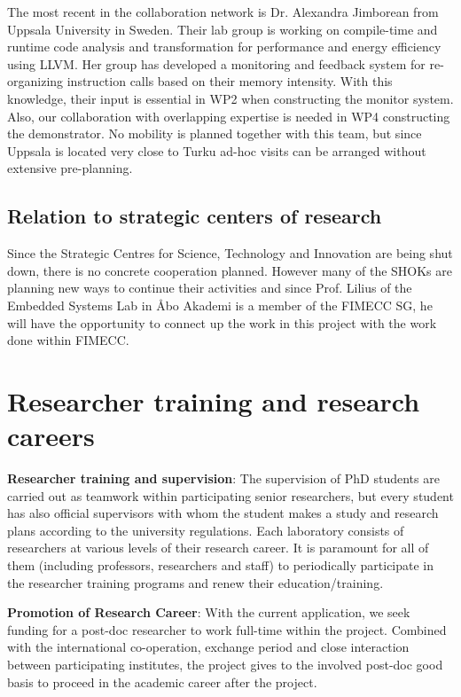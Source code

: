 \documentclass{article}
\begin{document}
The most recent in the collaboration network is Dr. Alexandra Jimborean from Uppsala University in Sweden.
Their lab group is working on compile-time and runtime code analysis and transformation for performance and energy efficiency using LLVM.
Her group has developed a monitoring and feedback system for re-organizing instruction calls based on their memory intensity.
With this knowledge, their input is essential in WP2 when constructing the monitor system.
Also, our collaboration with overlapping expertise is needed in WP4 constructing the demonstrator.
No mobility is planned together with this team, but since Uppsala is located very close to Turku ad-hoc visits can be arranged without extensive pre-planning.


\subsection{Relation to strategic centers of research}
Since the Strategic Centres for Science, Technology and Innovation are being shut down, there is no concrete cooperation planned. 
However many of the SHOKs are planning new ways to continue their activities and since Prof. Lilius of the Embedded Systems Lab in \AA{}bo Akademi is a member of the FIMECC SG, 
he will have the opportunity to connect up the work in this project with the work done within FIMECC.


\section{Researcher training and research careers}
\textbf{Researcher training and supervision}: The supervision of PhD students are carried out as teamwork within participating senior researchers, 
but every student has also official supervisors with whom the student makes a study and research plans according to the university regulations. 
Each laboratory consists of researchers at various levels of their research career. 
It is paramount for all of them (including professors, researchers and staff) to periodically participate in the researcher training programs and renew their education/training.\smallskip

\textbf{Promotion of Research Career}: With the current application, we seek funding for a post-doc researcher to work full-time within the project. 
Combined with the international co-operation, exchange period and close interaction between participating institutes, the project gives to the involved post-doc good basis to proceed in the academic career after the project.
\end{document}
